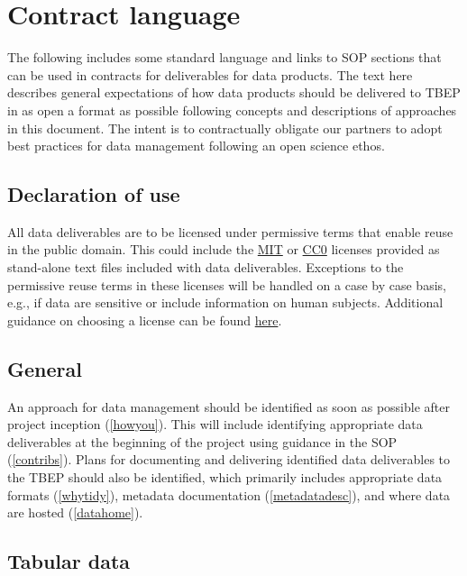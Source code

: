 \documentclass[
]{book}
\begin{document}
\hypertarget{contract-language}{%
\section{Contract language}\label{contract-language}}

The following includes some standard language and links to SOP sections that can be used in contracts for deliverables for data products. The text here describes general expectations of how data products should be delivered to TBEP in as open a format as possible following concepts and descriptions of approaches in this document. The intent is to contractually obligate our partners to adopt best practices for data management following an open science ethos.

\hypertarget{declaration-of-use}{%
\subsection{Declaration of use}\label{declaration-of-use}}

All data deliverables are to be licensed under permissive terms that enable reuse in the public domain. This could include the \href{https://choosealicense.com/licenses/mit/}{MIT} or \href{https://choosealicense.com/licenses/cc0-1.0/}{CC0} licenses provided as stand-alone text files included with data deliverables. Exceptions to the permissive reuse terms in these licenses will be handled on a case by case basis, e.g., if data are sensitive or include information on human subjects. Additional guidance on choosing a license can be found \href{https://choosealicense.com/}{here}.

\hypertarget{general}{%
\subsection{General}\label{general}}

An approach for data management should be identified as soon as possible after project inception (\ref{howyou}). This will include identifying appropriate data deliverables at the beginning of the project using guidance in the SOP (\ref{contribs}). Plans for documenting and delivering identified data deliverables to the TBEP should also be identified, which primarily includes appropriate data formats (\ref{whytidy}), metadata documentation (\ref{metadatadesc}), and where data are hosted (\ref{datahome}).

\hypertarget{tabular-data}{%
\subsection{Tabular data}\label{tabular-data}}
\end{document}
